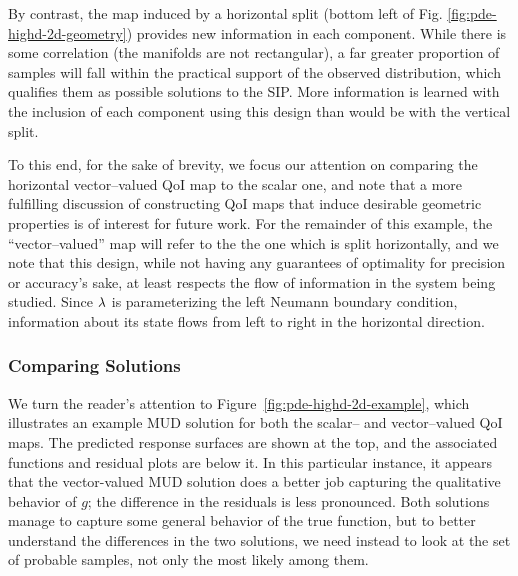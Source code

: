 By contrast, the map induced by a horizontal split (bottom left of Fig. \ref{fig:pde-highd-2d-geometry}) provides new information in each component.
While there is some correlation (the manifolds are not rectangular), a far greater proportion of samples will fall within the practical support of the observed distribution, which qualifies them as possible solutions to the SIP.
More information is learned with the inclusion of each component using this design than would be with the vertical split.

To this end, for the sake of brevity, we focus our attention on comparing the horizontal vector--valued QoI map to the scalar one, and note that a more fulfilling discussion of constructing QoI maps that induce desirable geometric properties is of interest for future work.
For the remainder of this example, the ``vector--valued'' map will refer to the the one which is split horizontally, and we note that this design, while not having any guarantees of optimality for precision or accuracy's sake, at least respects the flow of information in the system being studied.
Since $\lambda$ is parameterizing the left Neumann boundary condition, information about its state flows from left to right in the horizontal direction.



\FloatBarrier
\subsubsection{Comparing Solutions}

We turn the reader's attention to Figure~\ref{fig:pde-highd-2d-example}, which illustrates an example MUD solution for both the scalar-- and vector--valued QoI maps.
The predicted response surfaces are shown at the top, and the associated functions and residual plots are below it.
In this particular instance, it appears that the vector-valued MUD solution does a better job capturing the qualitative behavior of $g$; the difference in the residuals is less pronounced.
Both solutions manage to capture some general behavior of the true function, but to better understand the differences in the two solutions, we need instead to look at the set of probable samples, not only the most likely among them.

